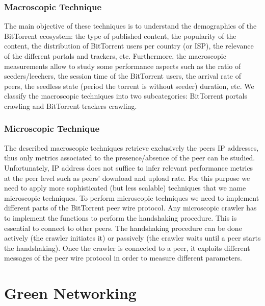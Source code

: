 \subsubsection{Macroscopic Technique}
The main objective of these techniques is to understand the demographics of the BitTorrent ecosystem: the type of published content, the popularity of the content, the distribution of BitTorrent users per country (or ISP), the relevance of the different portals and trackers, etc. 
Furthermore, the macroscopic measurements allow to study some performance aspects such as the ratio of seeders/leechers, the session time of the BitTorrent users, the arrival rate of peers, the seedless state (period the torrent is without seeder) duration, etc.
We classify the macroscopic techniques into two subcategories: BitTorrent portals crawling and BitTorrent trackers crawling.

\subsubsection{Microscopic Technique}
The described macroscopic techniques retrieve exclusively the peers IP addresses, thus only metrics associated to the presence/absence of the peer can be studied. Unfortunately, IP address does not suffice to infer relevant performance metrics at the peer level such as peers’ download and upload rate. 
For this purpose we need to apply more sophisticated (but less scalable) techniques that we name microscopic techniques.
To perform microscopic techniques we need to implement different parts of the BitTorrent peer wire protocol. 
Any microscopic crawler has to implement the functions to perform the handshaking procedure. 
This is essential to connect to other peers. 
The handshaking procedure can be done actively (the crawler initiates it) or passively (the crawler waits until a peer starts the handshaking). 
Once the crawler is connected to a peer, it exploits different messages of the peer wire protocol in order to measure different parameters. 


\section{Green Networking}

